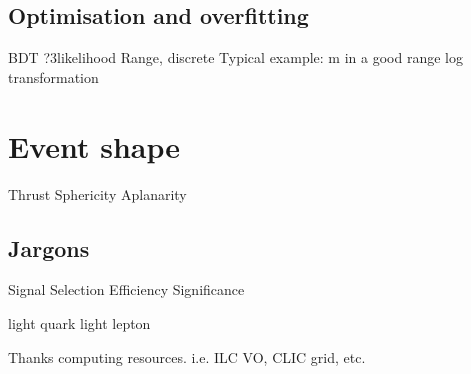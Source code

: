 \subsection{Optimisation and overfitting}







BDT
?3likelihood
Range, discrete
Typical example:
m in a good range
log transformation

\section{Event shape}
Thrust
Sphericity
Aplanarity
\subsection{Jargons}
Signal
Selection
Efficiency
Significance

\qlight light quark
light lepton

Thanks computing resources. i.e. ILC VO, CLIC grid, etc. 